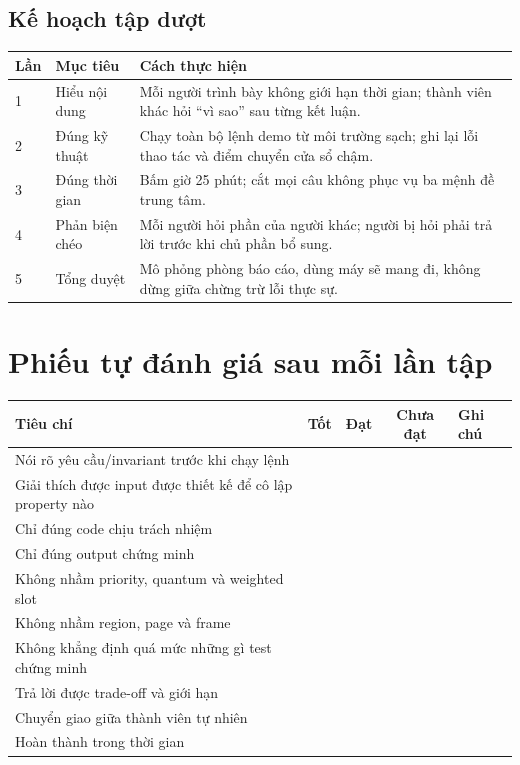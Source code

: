 \documentclass[12pt,a4paper]{article}
\begin{document}
\subsection{Kế hoạch tập dượt}

\begin{longtable}{|p{2.2cm}|p{4.1cm}|p{7.8cm}|}
\hline
\textbf{Lần} & \textbf{Mục tiêu} & \textbf{Cách thực hiện}\\ \hline
1 & Hiểu nội dung & Mỗi người trình bày không giới hạn thời gian; thành viên
khác hỏi ``vì sao'' sau từng kết luận.\\ \hline
2 & Đúng kỹ thuật & Chạy toàn bộ lệnh demo từ môi trường sạch; ghi lại lỗi thao
tác và điểm chuyển cửa sổ chậm.\\ \hline
3 & Đúng thời gian & Bấm giờ 25 phút; cắt mọi câu không phục vụ ba mệnh đề
trung tâm.\\ \hline
4 & Phản biện chéo & Mỗi người hỏi phần của người khác; người bị hỏi phải trả
lời trước khi chủ phần bổ sung.\\ \hline
5 & Tổng duyệt & Mô phỏng phòng báo cáo, dùng máy sẽ mang đi, không dừng giữa
chừng trừ lỗi thực sự.\\ \hline
\end{longtable}

\section{Phiếu tự đánh giá sau mỗi lần tập}

\begin{longtable}{|p{6.3cm}|c|c|c|p{3cm}|}
\hline
\textbf{Tiêu chí} & \textbf{Tốt} & \textbf{Đạt} & \textbf{Chưa đạt} &
\textbf{Ghi chú}\\ \hline
Nói rõ yêu cầu/invariant trước khi chạy lệnh & & & &\\ \hline
Giải thích được input được thiết kế để cô lập property nào & & & &\\ \hline
Chỉ đúng code chịu trách nhiệm & & & &\\ \hline
Chỉ đúng output chứng minh & & & &\\ \hline
Không nhầm priority, quantum và weighted slot & & & &\\ \hline
Không nhầm region, page và frame & & & &\\ \hline
Không khẳng định quá mức những gì test chứng minh & & & &\\ \hline
Trả lời được trade-off và giới hạn & & & &\\ \hline
Chuyển giao giữa thành viên tự nhiên & & & &\\ \hline
Hoàn thành trong thời gian & & & &\\ \hline
\end{longtable}
\end{document}
